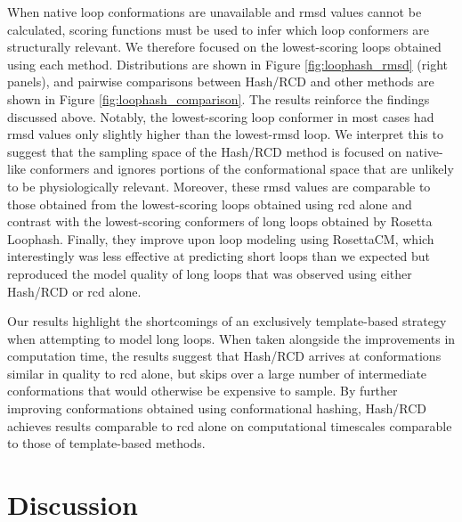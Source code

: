 When native loop conformations are unavailable and \gls{rmsd} values cannot be calculated, scoring functions must be used to infer which loop conformers are structurally relevant. We therefore focused on the lowest-scoring loops obtained using each method. Distributions are shown in Figure \ref{fig:loophash_rmsd} (right panels), and pairwise comparisons between Hash/RCD and other methods are shown in Figure \ref{fig:loophash_comparison}. The results reinforce the findings discussed above. Notably, the lowest-scoring loop conformer in most cases had \gls{rmsd} values only slightly higher than the lowest-\gls{rmsd} loop. We interpret this to suggest that the sampling space of the Hash/RCD method is focused on native-like conformers and ignores portions of the conformational space that are unlikely to be physiologically relevant. Moreover, these \gls{rmsd} values are comparable to those obtained from the lowest-scoring loops obtained using \gls{rcd} alone and contrast with the lowest-scoring conformers of long loops obtained by Rosetta Loophash. Finally, they improve upon loop modeling using RosettaCM, which interestingly was less effective at predicting short loops than we expected but reproduced the model quality of long loops that was observed using either Hash/RCD or \gls{rcd} alone.

Our results highlight the shortcomings of an exclusively template-based strategy when attempting to model long loops. When taken alongside the improvements in computation time, the results suggest that Hash/RCD arrives at conformations similar in quality to \gls{rcd} alone, but skips over a large number of intermediate conformations that would otherwise be expensive to sample. By further improving conformations obtained using conformational hashing, Hash/RCD achieves results comparable to \gls{rcd} alone on computational timescales comparable to those of template-based methods.

\newpage

\section{Discussion}

